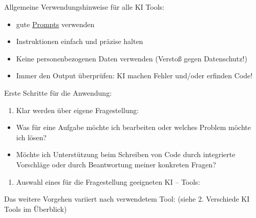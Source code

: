 \documentclass[
  letterpaper,
  DIV=11]{scrreprt}
\providecommand{\tightlist}{%
  \setlength{\itemsep}{0pt}\setlength{\parskip}{0pt}}\usepackage{longtable,booktabs,array}
\begin{document}
\begin{tcolorbox}[enhanced jigsaw, left=2mm, rightrule=.15mm, bottomrule=.15mm, bottomtitle=1mm, colback=white, leftrule=.75mm, breakable, titlerule=0mm, toptitle=1mm, opacityback=0, opacitybacktitle=0.6, colbacktitle=quarto-callout-important-color!10!white, colframe=quarto-callout-important-color-frame, arc=.35mm, toprule=.15mm, coltitle=black, title=\textcolor{quarto-callout-important-color}{\faExclamation}\hspace{0.5em}{Wichtig}]

Allgemeine Verwendungshinweise für alle KI Tools:

\begin{itemize}
\item
  gute
  \href{https://www.intern.fau.de/informationstechnik-it/it-tipps-aus-dem-cio-office/prompting-lernen/}{Prompts}
  verwenden
\item
  Instruktionen einfach und präzise halten
\item
  Keine personenbezogenen Daten verwenden (Verstoß gegen Datenschutz!)
\item
  Immer den Output überprüfen: KI machen Fehler und/oder erfinden Code!
\end{itemize}

\end{tcolorbox}

Erste Schritte für die Anwendung:

\begin{enumerate}
\def\labelenumi{\arabic{enumi}.}
\tightlist
\item
  Klar werden über eigene Fragestellung:
\end{enumerate}

\begin{itemize}
\tightlist
\item
  Was für eine Aufgabe möchte ich bearbeiten oder welches Problem möchte
  ich lösen?
\item
  Möchte ich Unterstützung beim Schreiben von Code durch integrierte
  Vorschläge oder durch Beantwortung meiner konkreten Fragen?
\end{itemize}

\begin{enumerate}
\def\labelenumi{\arabic{enumi}.}
\setcounter{enumi}{1}
\tightlist
\item
  Auswahl eines für die Fragestellung geeigneten KI -- Tools:
\end{enumerate}

Das weitere Vorgehen variiert nach verwendetem Tool: (siehe 2.
Verschiede KI Tools im Überblick)
\end{document}
